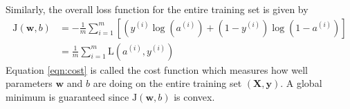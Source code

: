 \documentclass{beamer}
\begin{document}
\begin{frame}[allowframebreaks]
Similarly, the overall loss function for the entire training set is given by 
\begin{equation}\label{eqn:cost}
\begin{split}
\mathrm{J}(\bm{w}, b) &=-\frac{1}{m} \sum_{i=1}^{m}\left[\left(y^{(i)} \log \left(a^{(i)}\right)+\left(1-y^{(i)}\right) \log \left(1-a^{(i)}\right)\right]\right. \\
	&=\frac{1}{m} \sum_{i=1}^{m} \mathrm{L}\left(a^{(i)}, y^{(i)}\right)
\end{split}
\end{equation}
Equation \eqref{eqn:cost} is called the {cost function} which measures how well parameters $\bm{w}$ and $b$ are doing on the entire training set $(\bm{X},\bm{y})$. A global minimum is guaranteed since $\mathrm{J}(\bm{w}, b)$ is convex.
\end{frame}
\end{document}
